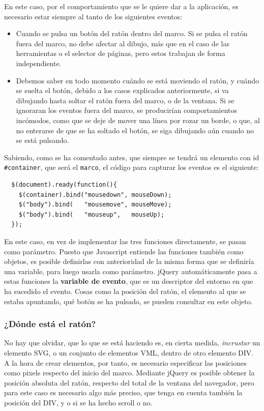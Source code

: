 En este caso, por el comportamiento que se le quiere dar a la aplicación, es necesario estar siempre al tanto de los siguientes eventos:
\begin{itemize}
  \item Cuando se pulsa un botón del ratón dentro del marco. Si se pulsa el ratón fuera del marco, no debe afectar al dibujo, más que en el caso de las herramientas o el selector de páginas, pero estos trabajan de forma independiente.
  \item Debemos saber en todo momento cuándo se está moviendo el ratón, y cuándo se suelta el botón, debido a los casos explicados anteriormente, si va dibujando hasta soltar el ratón fuera del marco, o de la ventana. Si se ignoraran los eventos fuera del marco, se producirían comportamientos incómodos, como que se deje de mover una línea por rozar un borde, o que, al no enterarse de que se ha soltado el botón, se siga dibujando aún cuando no se está pulsando.
\end{itemize}

Sabiendo, como se ha comentado antes, que siempre se tendrá un elemento con id \texttt{\#container}, que será el \texttt{marco}, el código para capturar los eventos es el siguiente:

\begin{verbatim}
  $(document).ready(function(){
    $(container).bind("mousedown", mouseDown);
    $("body").bind(   "mousemove", mouseMove);
    $("body").bind(   "mouseup",   mouseUp);
  });
\end{verbatim}

En este caso, en vez de implementar las tres funciones directamente, se pasan como parámetro. Puesto que Javascript entiende las funciones también como objetos, es posible definirlas con anterioridad de la misma forma que se definiría una variable, para luego usarla como parámetro. jQuery automáticamente pasa a estas funciones la \textbf{variable de evento}, que es un descriptor del entorno en que ha sucedido el evento. Cosas como la posición del ratón, el elemento al que se estaba apuntando, qué botón se ha pulsado, se pueden consultar en este objeto.


\subsubsection{¿Dónde está el ratón?} %
\label{ssub:donde_esta_el_raton}

No hay que olvidar, que lo que se está haciendo es, en cierta medida, \emph{incrustar} un elemento SVG, o un conjunto de elementos VML, dentro de otro elemento DIV. A la hora de crear elementos, por tanto, es necesario especificar las posiciones como pixels respecto del inicio del marco. Mediante jQuery es posible obtener la posición absoluta del ratón, respecto del total de la ventana del navegador, pero para este caso es necesario algo más preciso, que tenga en cuenta también la posición del DIV, y o si se ha hecho scroll o no.

